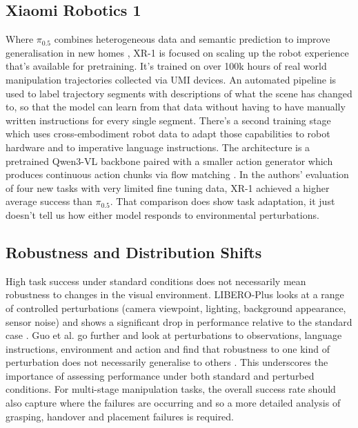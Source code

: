 \documentclass[10pt,twocolumn,letterpaper]{article}
\begin{document}
\subsection{Xiaomi Robotics 1}
Where $\pi_{0.5}$ combines heterogeneous data and semantic prediction to improve generalisation in new homes \cite{black2025pi05}, XR-1 is focused on scaling up the robot experience that's available for pretraining. It's trained on over 100k hours of real world manipulation trajectories collected via UMI devices. An automated pipeline is used to label trajectory segments with descriptions of what the scene has changed to, so that the model can learn from that data without having to have manually written instructions for every single segment. There's a second training stage which uses cross-embodiment robot data to adapt those capabilities to robot hardware and to imperative language instructions. The architecture is a pretrained Qwen3-VL backbone paired with a smaller action generator which produces continuous action chunks via flow matching \cite{team2026xiaomi}. In the authors' evaluation of four new tasks with very limited fine tuning data, XR-1 achieved a higher average success than $\pi_{0.5}$. That comparison does show task adaptation, it just doesn't tell us how either model responds to environmental perturbations.

\subsection{Robustness and Distribution Shifts}
High task success under standard conditions does not necessarily mean robustness to changes in the visual environment. LIBERO-Plus looks at a range of controlled perturbations (camera viewpoint, lighting, background appearance, sensor noise) and shows a significant drop in performance relative to the standard case \cite{fei2026liberoplus}. Guo et al. go further and look at perturbations to observations, language instructions, environment and action and find that robustness to one kind of perturbation does not necessarily generalise to others \cite{guo2026robustvla}. This underscores the importance of assessing performance under both standard and perturbed conditions. For multi-stage manipulation tasks, the overall success rate should also capture where the failures are occurring and so a more detailed analysis of grasping, handover and placement failures is required.
\end{document}
